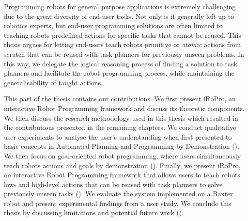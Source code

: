 Programming robots for general purpose applications is extremely challenging due to the great diversity of end-user tasks.
Not only is it generally left up to robotics experts, but end-user programming solutions are often limited to teaching robots predefined actions for specific tasks that cannot be reused.
This thesis argues for letting end-users teach robots primitive or \textit{atomic} actions from scratch that can be reused with task planners for previously unseen problems.
In this way, we delegate the logical reasoning process of finding a solution to task planners and facilitate the robot programming process, while maintaining the generalisability of taught actions.

This part of the thesis contains our contributions.
We first present iRoPro, an interactive Robot Programming framework and discuss its theoretic components.
We then discuss the research methodology used in this thesis which resulted in the contributions presented in the remaining chapters.
We conduct qualitative user experiments to analyse the user's understanding when first presented to basic concepts in Automated Planning and Programming by Demonstration ().
We then focus on goal-oriented robot programming, where users simultaneously teach robots actions and goals by demonstration ().
Finally, we present iRoPro, an interactive Robot Programming framework that allows users to teach robots low- and high-level actions that can be reused with task planners to solve previously unseen tasks ().
We evaluate the system implemented on a Baxter robot and present experimental findings from a user study. %
We conclude this thesis by discussing limitations and potential future work ().
\minitoc%

